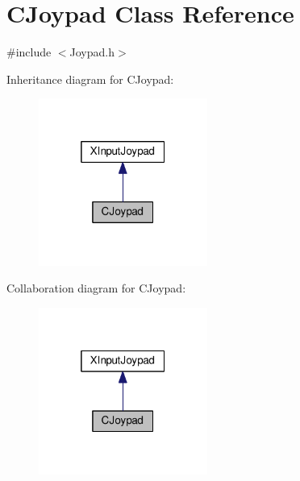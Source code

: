 \hypertarget{class_c_joypad}{}\section{C\+Joypad Class Reference}
\label{class_c_joypad}


{\ttfamily \#include $<$Joypad.\+h$>$}



Inheritance diagram for C\+Joypad\+:\nopagebreak
\begin{figure}[H]
\begin{center}
\leavevmode
\includegraphics[width=157pt]{class_c_joypad__inherit__graph}
\end{center}
\end{figure}


Collaboration diagram for C\+Joypad\+:\nopagebreak
\begin{figure}[H]
\begin{center}
\leavevmode
\includegraphics[width=157pt]{class_c_joypad__coll__graph}
\end{center}
\end{figure}
